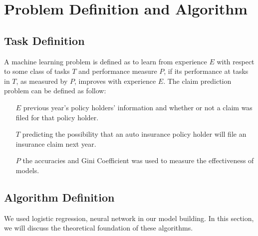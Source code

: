 \documentclass{standalone}
\begin{document}
\section{Problem Definition and Algorithm}

\subsection{Task Definition}


A machine learning problem is defined as to learn from experience $E$ with
respect to some class of tasks $T$ and performance measure $P$, if its
performance at tasks in $T$, as measured by $P$, improves with experience
$E$\cite{Mitchell:1997:ML:541177}.
The claim prediction problem can be defined as follow:
\begin{itemize}[] 
    \item[$E$] previous year's policy holders' information and whether or not a
        claim was filed for that policy holder.
    \item[$T$] predicting the possibility that an auto insurance policy
        holder will file an insurance claim next year.
    \item[$P$] the accuracies and Gini Coefficient was used to measure the
        effectiveness of models.
\end{itemize}

\subsection{Algorithm Definition}

We used logistic regression, neural network in our model building. In this
section, we will discuss the theoretical foundation of these algorithms.

\end{document}
